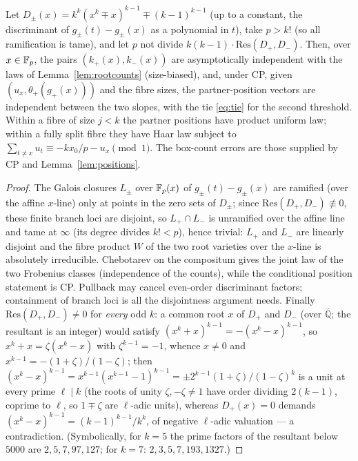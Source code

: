 \begin{lemma}\label{lem:twoslopes}
Let $D_\pm(x)=k^k(x^k\mp x)^{k-1}\mp(k-1)^{k-1}$ (up to a constant, the discriminant of $g_\pm(t)-g_\pm(x)$ as a polynomial in $t$), take $p>k!$ (so all ramification is tame), and let $p$ not
divide $k(k-1)\cdot\mathrm{Res}(D_+,D_-)$.  Then, over $x\in\mathbb{F}_p$, the pairs $(k_+(x),k_-(x))$ are asymptotically independent with the laws of
Lemma~\ref{lem:rootcounts} (size-biased), and, under CP, given $(u_x,\theta_+(g_+(x)))$ and the fibre sizes, the partner-position vectors are independent
between the two slopes, with the tie \eqref{eq:tie} for the second threshold.  Within a fibre of size $j<k$ the partner positions have product uniform law;
within a fully split fibre they have Haar law subject to
$\sum_{t\ne x}u_t\equiv-kx_0/p-u_x\pmod1$.  The box-count errors are those supplied by CP and Lemma~\ref{lem:positions}.
\end{lemma}
\begin{proof}
The Galois closures $L_\pm$ over $\mathbb{F}_p(x)$ of $g_\pm(t)-g_\pm(x)$ are ramified (over the affine $x$-line) only at points in the zero sets of $D_\pm$; since
$\mathrm{Res}(D_+,D_-)\not\equiv0$, these finite branch loci are disjoint, so $L_+\cap L_-$ is unramified over the affine line and tame at $\infty$
(its degree divides $k!<p$), hence trivial: $L_+$ and $L_-$ are linearly disjoint and the fibre product $W$ of the two root varieties over the $x$-line is
absolutely irreducible.  Chebotarev on the compositum gives the joint law of the two Frobenius classes (independence of the counts), while the conditional position statement is CP.  Pullback may cancel even-order discriminant factors; containment of branch loci is all the disjointness argument needs.
Finally $\mathrm{Res}(D_+,D_-)\ne0$ for \emph{every} odd $k$: a common root $x$ of $D_+$ and $D_-$ (over $\overline{\mathbb Q}$; the
resultant is an integer) would satisfy $(x^k+x)^{k-1}=-(x^k-x)^{k-1}$, so $x^k+x=\zeta(x^k-x)$ with $\zeta^{k-1}=-1$, whence $x\ne0$ and
$x^{k-1}=-(1+\zeta)/(1-\zeta)$; then $(x^k-x)^{k-1}=x^{k-1}(x^{k-1}-1)^{k-1}=\pm2^{k-1}(1+\zeta)/(1-\zeta)^{k}$ is a unit at every prime $\ell\mid k$
(the roots of unity $\zeta,-\zeta\ne1$ have order dividing $2(k-1)$, coprime to $\ell$, so $1\mp\zeta$ are $\ell$-adic units), whereas $D_+(x)=0$
demands $(x^k-x)^{k-1}=(k-1)^{k-1}/k^k$, of negative $\ell$-adic valuation — a contradiction.  (Symbolically, for $k=5$ the prime factors of the
resultant below $5000$ are $2,5,7,97,127$; for $k=7$: $2,3,5,7,193,1327$.)
\end{proof}

